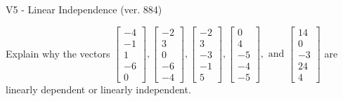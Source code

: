 \begin{exercise}
  \begin{exerciseTitle}V5 - Linear Independence (ver. 884)\end{exerciseTitle}
  \begin{exerciseStatement}
    Explain why the vectors \(\left[\begin{array}{r}
-4 \\
-1 \\
1 \\
-6 \\
0
\end{array}\right] , \left[\begin{array}{r}
-2 \\
3 \\
0 \\
-6 \\
-4
\end{array}\right] , \left[\begin{array}{r}
-2 \\
3 \\
-3 \\
-1 \\
5
\end{array}\right] , \left[\begin{array}{r}
0 \\
4 \\
-5 \\
-4 \\
-5
\end{array}\right] , \text{ and } \left[\begin{array}{r}
14 \\
0 \\
-3 \\
24 \\
4
\end{array}\right]\) are linearly dependent or linearly independent.	



\end{exerciseStatement}
\end{exercise}
